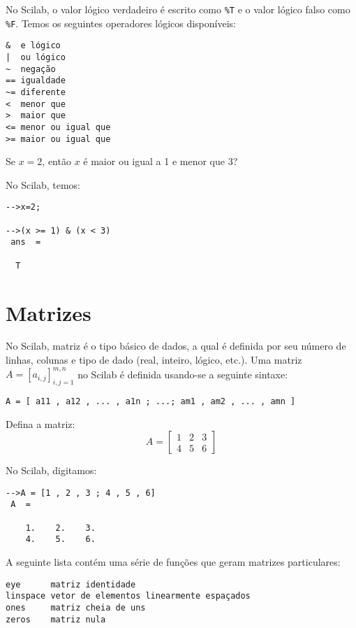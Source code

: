 No Scilab, o valor lógico verdadeiro é escrito como \verb+%T+ e o valor lógico falso como \verb+%F+. Temos os seguintes operadores lógicos disponíveis:
\begin{verbatim}
&  e lógico
|  ou lógico
~  negação
== igualdade
~= diferente
<  menor que
>  maior que
<= menor ou igual que
>= maior ou igual que
\end{verbatim}

\begin{ex}
  Se $x=2$, então $x$ é maior ou igual a 1 e menor que 3? 
\end{ex}
\begin{sol}
  No Scilab, temos:
\begin{verbatim}
-->x=2;
 
-->(x >= 1) & (x < 3)
 ans  =
 
  T  
\end{verbatim}
\end{sol}

\section{Matrizes}

No Scilab, matriz é o tipo básico de dados, a qual é definida por seu número de linhas, colunas e tipo de dado (real, inteiro, lógico, etc.). Uma matriz $A = [a_{i,j}]_{i,j=1}^{m,n}$ no Scilab é definida usando-se a seguinte sintaxe:
\begin{verbatim}
A = [ a11 , a12 , ... , a1n ; ...; am1 , am2 , ... , amn ]
\end{verbatim}

\begin{ex}
  Defina a matriz:
  \begin{equation*}
    A = \left[
      \begin{array}{ccc}
        1 & 2 & 3\\
        4 & 5 & 6
      \end{array}
\right]
  \end{equation*}
\end{ex}
\begin{sol}
  No Scilab, digitamos:
\begin{verbatim}
-->A = [1 , 2 , 3 ; 4 , 5 , 6]
 A  =
 
    1.    2.    3.  
    4.    5.    6.  
\end{verbatim}
\end{sol}

A seguinte lista contém uma série de funções que geram matrizes particulares:
\begin{verbatim}
eye      matriz identidade
linspace vetor de elementos linearmente espaçados
ones     matriz cheia de uns
zeros    matriz nula
\end{verbatim}

